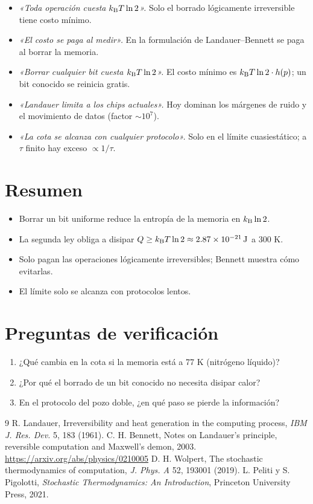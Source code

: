 \documentclass[11pt,a4paper]{article}
\begin{document}
\begin{error}
\begin{itemize}[nosep]
\item \emph{«Toda operación cuesta $k_{\mathrm B} T\ln2$».} Solo el borrado lógicamente irreversible tiene costo mínimo.
\item \emph{«El costo se paga al medir».} En la formulación de Landauer--Bennett se paga al borrar la memoria.
\item \emph{«Borrar cualquier bit cuesta $k_{\mathrm B} T\ln2$».} El costo mínimo es $k_{\mathrm B} T\ln2\cdot h(p)$; un bit conocido se reinicia gratis.
\item \emph{«Landauer limita a los chips actuales».} Hoy dominan los márgenes de ruido y el movimiento de datos (factor $\sim10^{7}$).
\item \emph{«La cota se alcanza con cualquier protocolo».} Solo en el límite cuasiestático; a $\tau$ finito hay exceso $\propto1/\tau$.
\end{itemize}
\end{error}

\section{Resumen}
\begin{itemize}[nosep]
\item Borrar un bit uniforme reduce la entropía de la memoria en $k_{\mathrm B}\ln2$.
\item La segunda ley obliga a disipar $Q\ge k_{\mathrm B} T\ln2\approx\SI{2.87e-21}{J}$ a 300 K.
\item Solo pagan las operaciones lógicamente irreversibles; Bennett muestra cómo evitarlas.
\item El límite solo se alcanza con protocolos lentos.
\end{itemize}

\section{Preguntas de verificación}
\begin{enumerate}[nosep]
\item ¿Qué cambia en la cota si la memoria está a 77 K (nitrógeno líquido)?
\item ¿Por qué el borrado de un bit conocido no necesita disipar calor?
\item En el protocolo del pozo doble, ¿en qué paso se pierde la información?
\end{enumerate}

\begin{thebibliography}{9}\small
{} R. Landauer, Irreversibility and heat generation in the computing process, \emph{IBM J. Res. Dev.} 5, 183 (1961).
 C. H. Bennett, Notes on Landauer's principle, reversible computation and Maxwell's demon, 2003. \url{https://arxiv.org/abs/physics/0210005}
 D. H. Wolpert, The stochastic thermodynamics of computation, \emph{J. Phys. A} 52, 193001 (2019).
 L. Peliti y S. Pigolotti, \emph{Stochastic Thermodynamics: An Introduction}, Princeton University Press, 2021.
\end{thebibliography}
\end{document}
